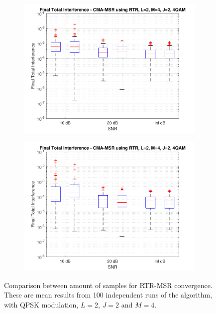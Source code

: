 \begin{figure}
\begin{subfigure}[b]{0.45\textwidth}
		\includegraphics[width=\linewidth]{./figs/BF_RTR_MSR_TIfinal_4QAM_L=2_M=4_J=2_K=200.pdf}
		\label{fig:rtr_msr_tidist200}
	\end{subfigure}
	\begin{subfigure}[b]{0.45\textwidth}
		\includegraphics[width=\linewidth]{./figs/BF_RTR_MSR_TIfinal_4QAM_L=2_M=4_J=2_K=1000.pdf}
		\label{fig:rtr_msr_tidist1000}
	\end{subfigure}
	\caption{Comparison between amount of samples for RTR-MSR convergence. These are mean results from 100 independent runs of the algorithm, with QPSK modulation, $L=2$, $J=2$ and $M=4$.}
	\label{fig:CMA_RTR_msr_qpsk_L2M4}
\end{figure}

